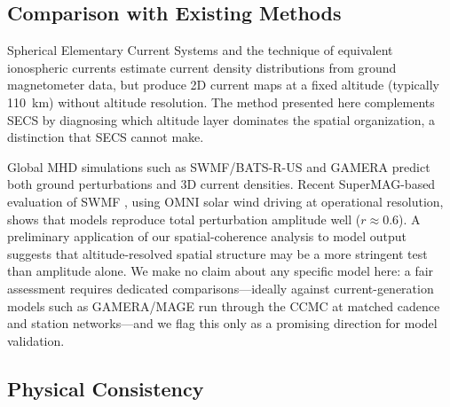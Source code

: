 \documentclass[11pt,letterpaper]{article}
\begin{document}
\subsection{Comparison with Existing Methods}

Spherical Elementary Current Systems \citep[SECS;][]{amm1999method} and the
technique of equivalent ionospheric currents
\citep{pulkkinen2003ionospheric} estimate current density distributions from
ground magnetometer data, but produce 2D current maps at a fixed altitude
(typically 110~km) without altitude resolution. The method presented here
complements SECS by diagnosing which altitude layer dominates the spatial
organization, a distinction that SECS cannot make.

Global MHD simulations such as SWMF/BATS-R-US \citep{toth2005swmf} and GAMERA
\citep{zhang2019gamera} predict both ground perturbations and 3D current
densities. Recent SuperMAG-based evaluation of SWMF
\citep{alshidi2022swmf}, using OMNI solar wind driving at operational resolution,
shows that models reproduce total perturbation amplitude well ($r \approx 0.6$).
A preliminary application of our spatial-coherence analysis to model output
suggests that altitude-resolved spatial structure may be a more stringent test
than amplitude alone. We make no claim about any specific model here: a fair
assessment requires dedicated comparisons---ideally against current-generation
models such as GAMERA/MAGE \citep{zhang2019gamera} run through the CCMC at matched
cadence and station networks---and we flag this only as a promising direction for
model validation.

\subsection{Physical Consistency}
\label{sec:physical}
\end{document}
